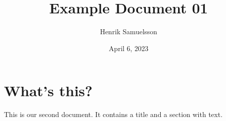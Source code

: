 \documentclass[a4paper,11pt]{article}
\title{Example Document 01}
\author{Henrik Samuelsson}
\date{April 6, 2023}
\begin{document}
\maketitle
\section{What's this?}
This is our second document. It contains a title and a section with text.
\end{document}
